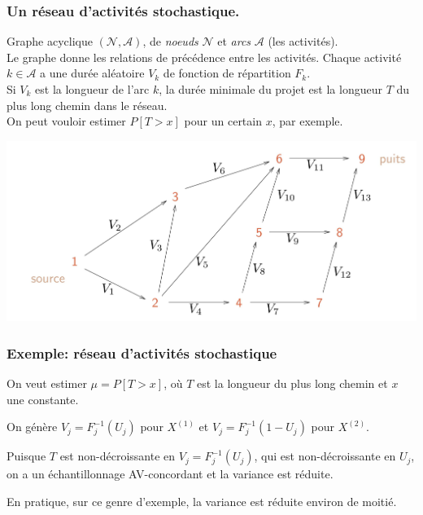 \documentclass[t,usepdftitle=false]{beamer}
\def\cA{\mathcal{A}}
\def\cN{\mathcal{N}}
\begin{document}
\begin{frame}[fragile]
	\frametitle{Un r\'eseau d'activit\'es stochastique.}
	
	Graphe acyclique $(\cN, \cA)$, de \emph{noeuds} ${\cN}$ et 
	\emph{arcs} ${\cA}$ (les activit\'es).\\
	Le graphe donne les relations de pr\'ec\'edence entre les activit\'es.
	Chaque activit\'e $k \in\cA$ a une dur\'ee al\'eatoire ${V_k}$ de
	fonction de r\'epartition $F_k$.\\
	Si $V_k$ est la longueur de l'arc $k$, la dur\'ee minimale du projet
	est la longueur ${T}$ du plus long chemin dans le r\'eseau.\\
	On peut vouloir estimer $P[T > x]$ pour un certain $x$, par exemple.
	
	\begin{center}
		\includegraphics[scale=0.4]{san.jpg}
	\end{center}
	
\end{frame}

\begin{frame}[fragile]
\frametitle{Exemple: r\'eseau d'activit\'es stochastique}

On veut estimer $\mu = P[T > x]$, o\`u $T$ est la longueur du
plus long chemin et $x$ une constante.  

\mbox{}

On g\'en\`ere $V_j = F_j^{-1}(U_j)$ pour $X^{(1)}$ et
$V_j = F_j^{-1}(1-U_j)$ pour $X^{(2)}$.

\mbox{}

Puisque $T$ est non-d\'ecroissante en $V_j = F_j^{-1}(U_j)$, qui est
non-d\'ecroissante en $U_j$, on a un \'echantillonnage AV-concordant
et la variance est r\'eduite.

\mbox{}

En pratique, sur ce genre d'exemple, la variance est r\'eduite environ de moiti\'e.

\end{frame}
\end{document}
